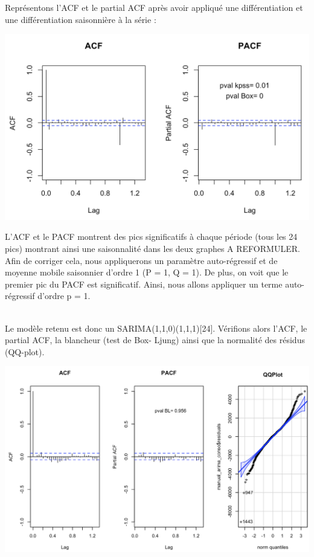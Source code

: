 \documentclass{article}
\theoremstyle{definition}
\theoremstyle{remark}
\begin{document}
\newpage
Représentons l'ACF et le partial ACF après avoir appliqué une différentiation et une différentiation saisonnière à la série :
\FloatBarrier
\begin{minipage}{.5\textwidth}
\hspace{-1cm}
\includegraphics[width=0.95\linewidth]{fig9.png}
    \label{fig:enter-label}
\end{minipage}
\begin{minipage}{.5\textwidth}
    L’ACF et le PACF montrent des pics significatifs à chaque période (tous les 24 pics) montrant ainsi
    une saisonnalité dans les deux graphes A REFORMULER. Afin de corriger cela, nous appliquerons un paramètre auto-régressif et de moyenne mobile saisonnier d’ordre 1 (P = 1, Q = 1).\newline
    De plus, on voit que le premier pic du PACF est significatif. Ainsi, nous allons appliquer un terme auto-régressif d’ordre p = 1.\newline\\    
\end{minipage}
\newline
\\
Le modèle retenu est donc un SARIMA(1,1,0)(1,1,1)[24].\newline
Vérifions alors l’ACF, le partial ACF, la blancheur (test de Box-
Ljung) ainsi que la normalité des résidus (QQ-plot).\newline
\FloatBarrier
\begin{minipage}{.5\textwidth}
\hspace{-1cm}
\includegraphics[width=0.95\linewidth]{fig10.png}
    \label{fig:enter-label}
\end{minipage}
\end{document}
